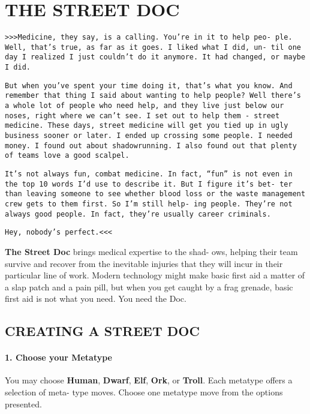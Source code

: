 
\section{THE STREET DOC}
\begin{multicols}{3}
\setlength{\parskip}{.05cm}

\texttt{>>>Medicine, they say, is a calling. You’re in it to help peo-
ple. Well, that’s true, as far as it goes. I liked what I did, un-
til one day I realized I just couldn’t do it anymore. It had
changed, or maybe I did.}

\texttt{But when you’ve spent your time doing it, that’s what you
know. And remember that thing I said about wanting to help
people? Well there’s a whole lot of people who need help,
and they live just below our noses, right where we can’t see.
I set out to help them - street medicine. These days, street
medicine will get you tied up in ugly business sooner or later.
I ended up crossing some people. I needed money. I found
out about shadowrunning. I also found out that plenty of
teams love a good scalpel.}

\texttt{It’s not always fun, combat medicine. In fact, “fun” is not even
in the top 10 words I’d use to describe it. But I figure it’s bet-
ter than leaving someone to see whether blood loss or the
waste management crew gets to them first. So I’m still help-
ing people. They’re not always good people. In fact, they’re
usually career criminals.}

\texttt{Hey, nobody’s perfect.<<<}

\textbf{The Street Doc} brings medical expertise to the shad-
ows, helping their team survive and recover from the
inevitable injuries that they will incur in their particular
line of work. Modern technology might make basic
first aid a matter of a slap patch and a pain pill, but
when you get caught by a frag grenade, basic first aid
is not what you need. You need the Doc.


\subsection{CREATING A STREET DOC}

\paragraph{1.  Choose your Metatype}

You may choose \textbf{Human}, \textbf{Dwarf}, \textbf{Elf}, \textbf{Ork}, or
\textbf{Troll}. Each metatype offers a selection of meta-
type moves. Choose one metatype move from
the options presented.


\end{multicols}
